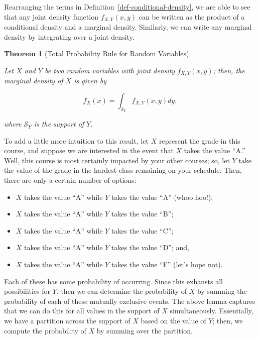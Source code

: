 \documentclass[
  letterpaper,
  DIV=11,
  numbers=noendperiod]{scrreprt}
\providecommand{\tightlist}{%
  \setlength{\itemsep}{0pt}\setlength{\parskip}{0pt}}\usepackage{longtable,booktabs,array}
\theoremstyle{definition}
\theoremstyle{plain}
\newtheorem{theorem}{Theorem}[chapter]
\theoremstyle{definition}
\theoremstyle{remark}
\begin{document}
Rearranging the terms in Definition~\ref{def-conditional-density}, we
are able to see that any joint density function \(f_{X, Y}(x, y)\) can
be written as the product of a conditional density and a marginal
density. Similarly, we can write any marginal density by integrating
over a joint density.

\begin{theorem}[Total Probability Rule for Random
Variables]\protect\hypertarget{thm-total-probability-rule}{}\label{thm-total-probability-rule}

Let \(X\) and \(Y\) be two random variables with joint density
\(f_{X,Y}(x,y)\); then, the marginal density of \(X\) is given by

\[f_X(x) = \int_{\mathcal{S}_Y} f_{X,Y}(x, y) dy,\]

where \(\mathcal{S}_Y\) is the support of \(Y\).

\end{theorem}

To add a little more intuition to this result, let \(X\) represent the
grade in this course, and suppose we are interested in the event that
\(X\) takes the value ``A.'' Well, this course is most certainly
impacted by your other courses; so, let \(Y\) take the value of the
grade in the hardest class remaining on your schedule. Then, there are
only a certain number of options:

\begin{itemize}
\tightlist
\item
  \(X\) takes the value ``A'' while \(Y\) takes the value ``A'' (whoo
  hoo!);
\item
  \(X\) takes the value ``A'' while \(Y\) takes the value ``B'';
\item
  \(X\) takes the value ``A'' while \(Y\) takes the value ``C'';
\item
  \(X\) takes the value ``A'' while \(Y\) takes the value ``D''; and,
\item
  \(X\) takes the value ``A'' while \(Y\) takes the value ``F'' (let's
  hope not).
\end{itemize}

Each of these has some probability of occurring. Since this exhausts all
possibilities for \(Y\), then we can determine the probability of \(X\)
by summing the probability of each of these mutually exclusive events.
The above lemma captures that we can do this for all values in the
support of \(X\) simultaneously. Essentially, we have a partition across
the support of \(X\) based on the value of \(Y\); then, we compute the
probability of \(X\) by summing over the partition.
\end{document}
